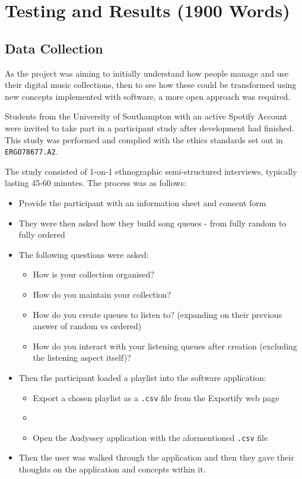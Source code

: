 \chapter{Testing and Results (1900 Words)}
\section{Data Collection}
As the project was aiming to initially understand how people manage and use their digital music collections, then to see how these could be transformed using new concepts implemented with software, a more open approach was required.

Students from the University of Southampton with an active Spotify Account were invited to take part in a participant study after development had finished. This study was performed and complied with the ethics standards set out in \lstinline|ERGO78677.A2|.

The study consisted of 1-on-1 ethnographic semi-structured interviews, typically lasting 45-60 minutes. The process was as follows:\begin{itemize}
    \item Provide the participant with an information sheet and consent form
    \item They were then asked how they build song queues - from fully random to fully ordered
    \item The following questions were asked:\begin{itemize}
        \item How is your collection organised?
        \item How do you maintain your collection?
        \item How do you create queues to listen to? (expanding on their previous answer of random vs ordered)
        \item How do you interact with your listening queues after creation (excluding the listening aspect itself)?
    \end{itemize}
    \item Then the participant loaded a playlist into the software application:\begin{itemize}
        \item Export a chosen playlist as a \lstinline|.csv| file from the Exportify web page
        \item \item Open the Audyssey application with the aformentioned \lstinline|.csv| file
    \end{itemize}
    \item Then the user was walked through the application and then they gave their thoughts on the application and concepts within it.
\end{itemize}

